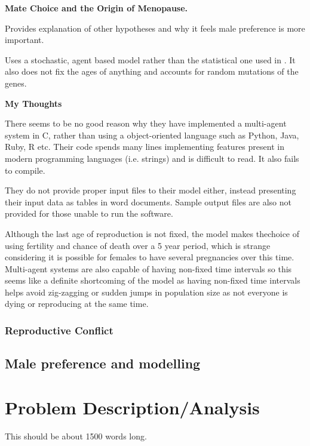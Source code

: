 \documentclass[authoryearcitations]{UoYCSproject}
\begin{document}
\begin{framed}
\noindent \textbf{Mate Choice and the Origin of Menopause. \cite{mateChoice2013}}

Provides explanation of other hypotheses and why it feels male preference is more important.

Uses a stochastic, agent based model rather than the statistical one used in \cite{whyMenMatter2007}. It also does not fix the ages of anything and accounts for random mutations of the genes.

\noindent \textbf{My Thoughts}

There seems to be no good reason why they have implemented a multi-agent system in C, rather than using a object-oriented language such as Python, Java, Ruby, R etc. Their code spends many lines implementing features present in modern programming languages (i.e. strings) and is difficult to read. It also fails to compile.

They do not provide proper input files to their model either, instead presenting their input data as tables in word documents. Sample output files are also not provided for those unable to run the software.

Although the last age of reproduction is not fixed, the model makes thechoice of using fertility and chance of death over a 5 year period, which is strange considering it is possible for females to have several pregnancies over this time. Multi-agent systems are also capable of having non-fixed time intervals so this seems like a definite shortcoming of the model as having non-fixed time intervals helps avoid zig-zagging or sudden jumps in population size as not everyone is dying or reproducing at the same time. 

\end{framed}


\subsection{Reproductive Conflict}

\section{Male preference and modelling}

\chapter{Problem Description/Analysis}
\label{cha:Problem Description}
This should be about 1500 words long.
\end{document}

